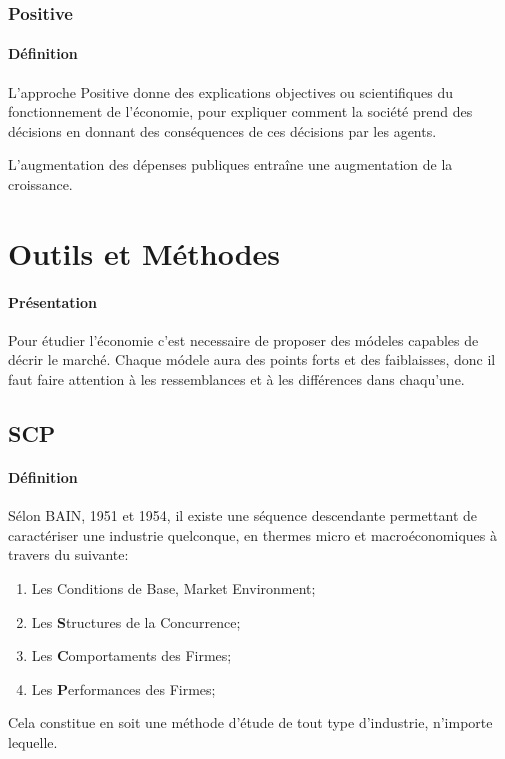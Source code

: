 \documentclass{article}
\begin{document}
\subsubsection{Positive}
\paragraph{Définition}L'approche Positive donne des explications objectives ou scientifiques du fonctionnement de l'économie, pour expliquer comment la société prend des décisions en donnant des conséquences de ces décisions par les agents.
\begin{example}
    L'augmentation des dépenses publiques entraîne une augmentation de la croissance.
\end{example}


\section{Outils et Méthodes}
\paragraph{Présentation}Pour étudier l'économie c'est necessaire de proposer des módeles capables de décrir le marché. Chaque módele aura des points forts et des faiblaisses, donc il faut faire attention à les ressemblances et à les différences dans chaqu'une.

\subsection{SCP}
\paragraph{Définition}Sélon BAIN, 1951 et 1954, il existe une séquence descendante permettant de caractériser une industrie  quelconque, en thermes micro et macroéconomiques à travers du suivante:
\begin{enumerate}[noitemsep]
    \item Les Conditions de Base, Market Environment;
    \item Les \textbf{S}tructures de la Concurrence;
    \item Les \textbf{C}omportaments des Firmes;
    \item Les \textbf{P}erformances des Firmes;
\end{enumerate}
Cela constitue en soit une méthode d'étude de tout type d'industrie, n'importe lequelle.
\end{document}
